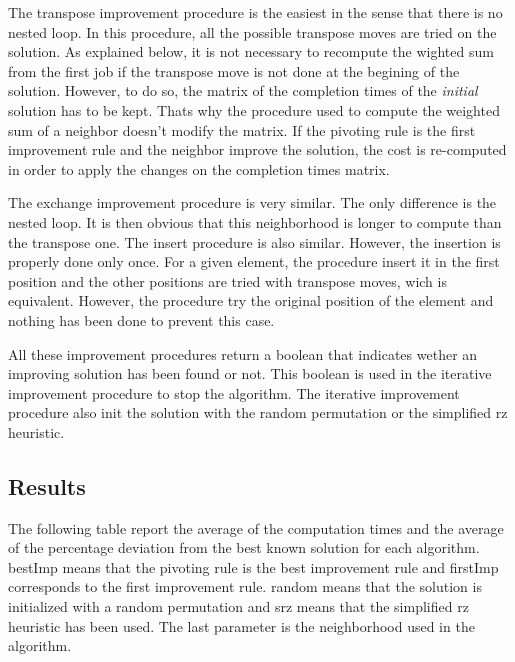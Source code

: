 \documentclass{article}
\begin{document}
The transpose improvement procedure is the easiest in the sense that there is no nested loop.
In this procedure, all the possible transpose moves are tried on the solution.
As explained below, it is not necessary to recompute the wighted sum from the first job if the transpose move is not done at the begining of the solution.
However, to do so, the matrix of the completion times of the \textit{initial} solution has to be kept.
Thats why the procedure used to compute the weighted sum of a neighbor doesn't modify the matrix.
If the pivoting rule is the first improvement rule and the neighbor improve the solution, the cost is re-computed in order to apply the changes on the completion times matrix. \newline

The exchange improvement procedure is very similar.
The only difference is the nested loop.
It is then obvious that this neighborhood is longer to compute than the transpose one.
The insert procedure is also similar.
However, the insertion is properly done only once.
For a given element, the procedure insert it in the first position and the other positions are tried with transpose moves, wich is equivalent.
However, the procedure try the original position of the element and nothing has been done to prevent this case. \newline

All these improvement procedures return a boolean that indicates wether an improving solution has been found or not.
This boolean is used in the iterative improvement procedure to stop the algorithm.
The iterative improvement procedure also init the solution with the random permutation or the simplified rz heuristic.

\subsection{Results}

The following table report the average of the computation times and the average of the percentage deviation from the best known solution for each algorithm.
bestImp means that the pivoting rule is the best improvement rule and firstImp corresponds to the first improvement rule.
random means that the solution is initialized with a random permutation and srz means that the simplified rz heuristic has been used.
The last parameter is the neighborhood used in the algorithm.
\end{document}
